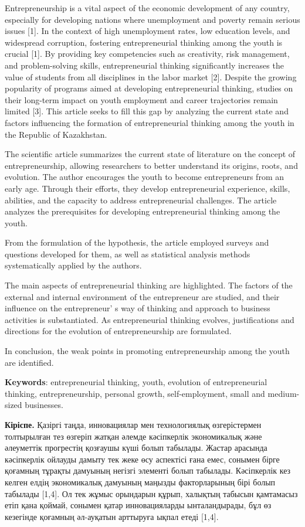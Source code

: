 Entrepreneurship is a vital aspect of the economic development of any
country, especially for developing nations where unemployment and
poverty remain serious issues {[}1{]}. In the context of high
unemployment rates, low education levels, and widespread corruption,
fostering entrepreneurial thinking among the youth is crucial {[}1{]}.
By providing key competencies such as creativity, risk management, and
problem-solving skills, entrepreneurial thinking significantly increases
the value of students from all disciplines in the labor market {[}2{]}.
Despite the growing popularity of programs aimed at developing
entrepreneurial thinking, studies on their long-term impact on youth
employment and career trajectories remain limited {[}3{]}. This article
seeks to fill this gap by analyzing the current state and factors
influencing the formation of entrepreneurial thinking among the youth in
the Republic of Kazakhstan.

The scientific article summarizes the current state of literature on the
concept of entrepreneurship, allowing researchers to better understand
its origins, roots, and evolution. The author encourages the youth to
become entrepreneurs from an early age. Through their efforts, they
develop entrepreneurial experience, skills, abilities, and the capacity
to address entrepreneurial challenges. The article analyzes the
prerequisites for developing entrepreneurial thinking among the youth.

From the formulation of the hypothesis, the article employed surveys and
questions developed for them, as well as statistical analysis methods
systematically applied by the authors.

The main aspects of entrepreneurial thinking are highlighted. The
factors of the external and internal environment of the entrepreneur are
studied, and their influence on the entrepreneur' s way
of thinking and approach to business activities is substantiated. As
entrepreneurial thinking evolves, justifications and directions for the
evolution of entrepreneurship are formulated.

In conclusion, the weak points in promoting entrepreneurship among the
youth are identified.

{\bfseries Keywords}: entrepreneurial thinking, youth, evolution of
entrepreneurial thinking, entrepreneurship, personal growth,
self-employment, small and medium-sized businesses.

{\bfseries Кіріспе.} Қазіргі таңда, инновациялар мен технологиялық
өзгерістермен толтырылған тез өзгеріп жатқан әлемде кәсіпкерлік
экономикалық және әлеуметтік прогрестің қозғаушы күші болып табылады.
Жастар арасында кәсіпкерлік ойлауды дамыту тек жеке өсу аспектісі ғана
емес, сонымен бірге қоғамның тұрақты дамуының негізгі элементі болып
табылады. Кәсіпкерлік кез келген елдің экономикалық дамуының маңызды
факторларының бірі болып табылады {[}1,4{]}. Ол тек жұмыс орындарын
құрып, халықтың табысын қамтамасыз етіп қана қоймай, сонымен қатар
инновацияларды ынталандырады, бұл өз кезегінде қоғамның әл-ауқатын
арттыруға ықпал етеді {[}1,4{]}.


